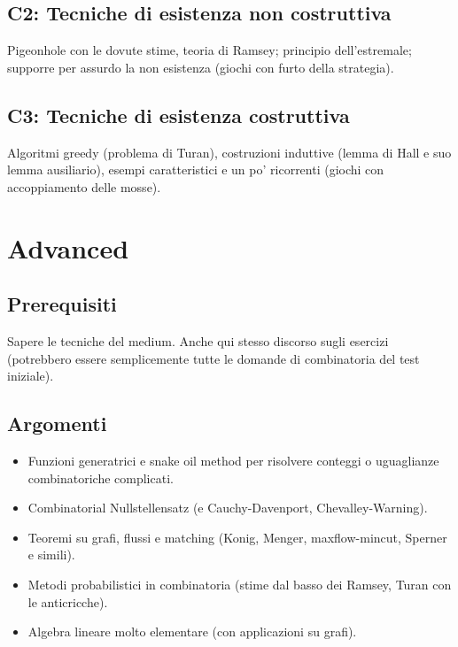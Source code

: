 \documentclass[a4paper,10pt]{article}
\begin{document}
\subsection{C2: Tecniche di esistenza non costruttiva}
Pigeonhole con le dovute stime, teoria di Ramsey; principio dell'estremale; supporre per assurdo la non esistenza (giochi con furto della strategia).


\subsection{C3: Tecniche di esistenza costruttiva}
Algoritmi greedy (problema di Turan), costruzioni induttive (lemma di Hall e suo lemma ausiliario), esempi caratteristici e un po' ricorrenti (giochi con accoppiamento delle mosse).



\section{Advanced}
\subsection{Prerequisiti}
Sapere le tecniche del medium. Anche qui stesso discorso sugli esercizi (potrebbero essere semplicemente tutte le domande di combinatoria del test iniziale).

\subsection{Argomenti}
\begin{itemize}
	\item Funzioni generatrici e snake oil method per risolvere conteggi o uguaglianze combinatoriche complicati.
	\item Combinatorial Nullstellensatz (e Cauchy-Davenport, Chevalley-Warning).
	\item Teoremi su grafi, flussi e matching (Konig, Menger, maxflow-mincut, Sperner e simili).
	\item Metodi probabilistici in combinatoria (stime dal basso dei Ramsey, Turan con le anticricche).
	\item Algebra lineare molto elementare (con applicazioni su grafi).
\end{itemize}
\end{document}
